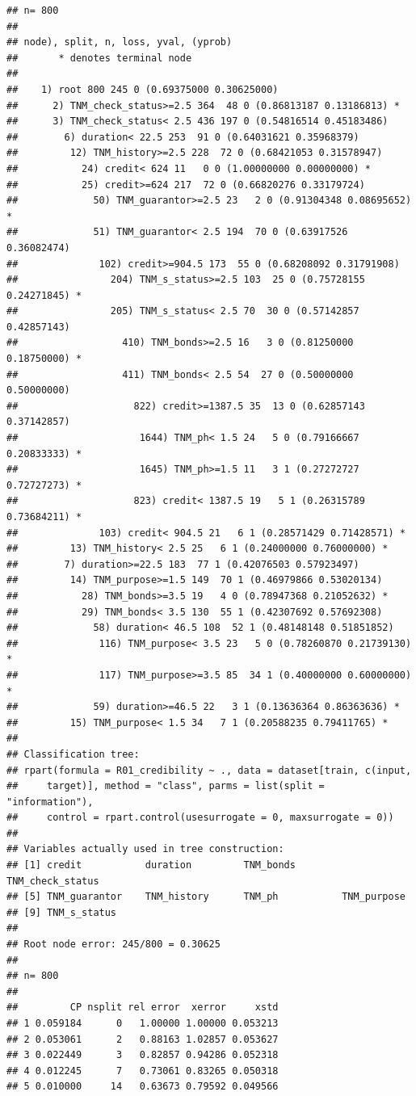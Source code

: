 \documentclass{article}\usepackage[]{graphicx}\usepackage[]{color}
\makeatletter
\newenvironment{kframe}{%
 \def\at@end@of@kframe{}%
 \ifinner\ifhmode%
  \def\at@end@of@kframe{\end{minipage}}%
  \begin{minipage}{\columnwidth}%
 \fi\fi%
 \def\FrameCommand##1{\hskip\@totalleftmargin \hskip-\fboxsep
 \colorbox{shadecolor}{##1}\hskip-\fboxsep
     \hskip-\linewidth \hskip-\@totalleftmargin \hskip\columnwidth}%
 \MakeFramed {\advance\hsize-\width
   \@totalleftmargin\z@ \linewidth\hsize
   \@setminipage}}%
 {\par\unskip\endMakeFramed%
 \at@end@of@kframe}
\newenvironment{knitrout}{}{} %
\makeatother
\begin{document}
\begin{knitrout}
\color{fgcolor}\begin{kframe}
\begin{verbatim}
## n= 800 
## 
## node), split, n, loss, yval, (yprob)
##       * denotes terminal node
## 
##    1) root 800 245 0 (0.69375000 0.30625000)  
##      2) TNM_check_status>=2.5 364  48 0 (0.86813187 0.13186813) *
##      3) TNM_check_status< 2.5 436 197 0 (0.54816514 0.45183486)  
##        6) duration< 22.5 253  91 0 (0.64031621 0.35968379)  
##         12) TNM_history>=2.5 228  72 0 (0.68421053 0.31578947)  
##           24) credit< 624 11   0 0 (1.00000000 0.00000000) *
##           25) credit>=624 217  72 0 (0.66820276 0.33179724)  
##             50) TNM_guarantor>=2.5 23   2 0 (0.91304348 0.08695652) *
##             51) TNM_guarantor< 2.5 194  70 0 (0.63917526 0.36082474)  
##              102) credit>=904.5 173  55 0 (0.68208092 0.31791908)  
##                204) TNM_s_status>=2.5 103  25 0 (0.75728155 0.24271845) *
##                205) TNM_s_status< 2.5 70  30 0 (0.57142857 0.42857143)  
##                  410) TNM_bonds>=2.5 16   3 0 (0.81250000 0.18750000) *
##                  411) TNM_bonds< 2.5 54  27 0 (0.50000000 0.50000000)  
##                    822) credit>=1387.5 35  13 0 (0.62857143 0.37142857)  
##                     1644) TNM_ph< 1.5 24   5 0 (0.79166667 0.20833333) *
##                     1645) TNM_ph>=1.5 11   3 1 (0.27272727 0.72727273) *
##                    823) credit< 1387.5 19   5 1 (0.26315789 0.73684211) *
##              103) credit< 904.5 21   6 1 (0.28571429 0.71428571) *
##         13) TNM_history< 2.5 25   6 1 (0.24000000 0.76000000) *
##        7) duration>=22.5 183  77 1 (0.42076503 0.57923497)  
##         14) TNM_purpose>=1.5 149  70 1 (0.46979866 0.53020134)  
##           28) TNM_bonds>=3.5 19   4 0 (0.78947368 0.21052632) *
##           29) TNM_bonds< 3.5 130  55 1 (0.42307692 0.57692308)  
##             58) duration< 46.5 108  52 1 (0.48148148 0.51851852)  
##              116) TNM_purpose< 3.5 23   5 0 (0.78260870 0.21739130) *
##              117) TNM_purpose>=3.5 85  34 1 (0.40000000 0.60000000) *
##             59) duration>=46.5 22   3 1 (0.13636364 0.86363636) *
##         15) TNM_purpose< 1.5 34   7 1 (0.20588235 0.79411765) *
## 
## Classification tree:
## rpart(formula = R01_credibility ~ ., data = dataset[train, c(input, 
##     target)], method = "class", parms = list(split = "information"), 
##     control = rpart.control(usesurrogate = 0, maxsurrogate = 0))
## 
## Variables actually used in tree construction:
## [1] credit           duration         TNM_bonds        TNM_check_status
## [5] TNM_guarantor    TNM_history      TNM_ph           TNM_purpose     
## [9] TNM_s_status    
## 
## Root node error: 245/800 = 0.30625
## 
## n= 800 
## 
##         CP nsplit rel error  xerror     xstd
## 1 0.059184      0   1.00000 1.00000 0.053213
## 2 0.053061      2   0.88163 1.02857 0.053627
## 3 0.022449      3   0.82857 0.94286 0.052318
## 4 0.012245      7   0.73061 0.83265 0.050318
## 5 0.010000     14   0.63673 0.79592 0.049566
\end{verbatim}
\end{kframe}

\end{knitrout}
\end{document}
